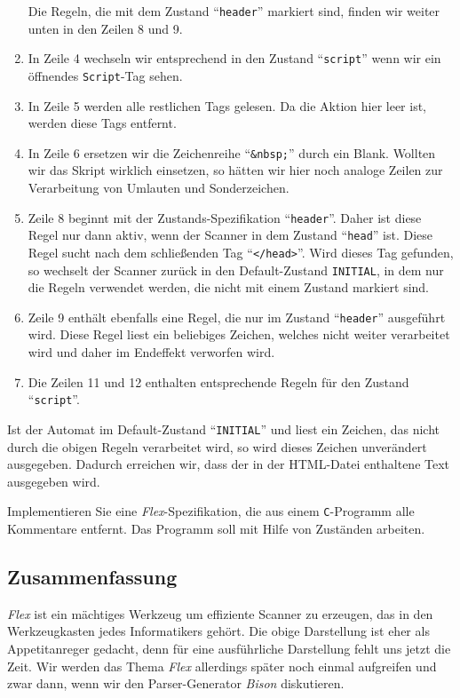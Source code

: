 \begin{enumerate}
      Die Regeln, die mit dem Zustand ``\texttt{header}'' markiert sind, finden wir weiter
      unten in den Zeilen 8 und 9.
\item In Zeile 4 wechseln wir entsprechend in den Zustand ``\texttt{script}'' wenn
      wir ein \"offnendes \texttt{Script}-Tag sehen.
\item In Zeile 5 werden alle restlichen Tags gelesen.  Da die Aktion hier leer ist,
      werden diese Tags entfernt.
\item In Zeile 6 ersetzen wir die Zeichenreihe ``\texttt{\&nbsp;}'' durch ein Blank.
      Wollten wir das Skript wirklich einsetzen, so h\"atten wir hier noch analoge
      Zeilen zur Verarbeitung von Umlauten und Sonderzeichen.
\item Zeile 8 beginnt mit der Zustands-Spezifikation ``\texttt{header}''.  Daher ist
      diese Regel nur dann aktiv, wenn der Scanner in dem Zustand ``\texttt{head}'' ist.
      Diese Regel sucht nach dem schlie{\ss}enden Tag ``\texttt{</head>}''.  Wird dieses Tag
      gefunden, so wechselt der Scanner zur\"uck in den Default-Zustand \texttt{INITIAL},
      in dem nur die Regeln verwendet werden, die nicht mit einem Zustand markiert sind.
\item Zeile 9 enth\"alt ebenfalls eine Regel, die nur im Zustand ``\texttt{header}''
      ausgef\"uhrt wird.  Diese Regel liest ein beliebiges Zeichen, welches nicht weiter 
      verarbeitet wird und daher im Endeffekt verworfen wird.
\item Die Zeilen 11 und 12 enthalten entsprechende Regeln f\"ur den Zustand
      ``\texttt{script}''.
\end{enumerate}
Ist der Automat im Default-Zustand ``\texttt{INITIAL}'' und liest ein Zeichen, das nicht
durch die obigen Regeln verarbeitet wird, so wird dieses Zeichen unver\"andert ausgegeben.
Dadurch erreichen wir, dass der in der HTML-Datei enthaltene Text ausgegeben wird.

\exercise
Implementieren Sie eine \textsl{Flex}-Spezifikation, die aus einem
\texttt{C}-Programm alle Kommentare entfernt.  Das Programm soll mit Hilfe von Zust\"anden arbeiten.


\subsection{Zusammenfassung}
\textsl{Flex}\/ ist ein m\"achtiges Werkzeug um effiziente Scanner zu erzeugen,
das in den Werkzeugkasten jedes Informatikers geh\"ort.  Die obige Darstellung ist eher als
Appetitanreger gedacht, denn f\"ur eine ausf\"uhrliche Darstellung fehlt uns jetzt die Zeit.
Wir werden das Thema \textsl{Flex}\/ allerdings sp\"ater noch einmal aufgreifen und zwar dann, wenn wir den
Parser-Generator \textsl{Bison}\/ diskutieren.

